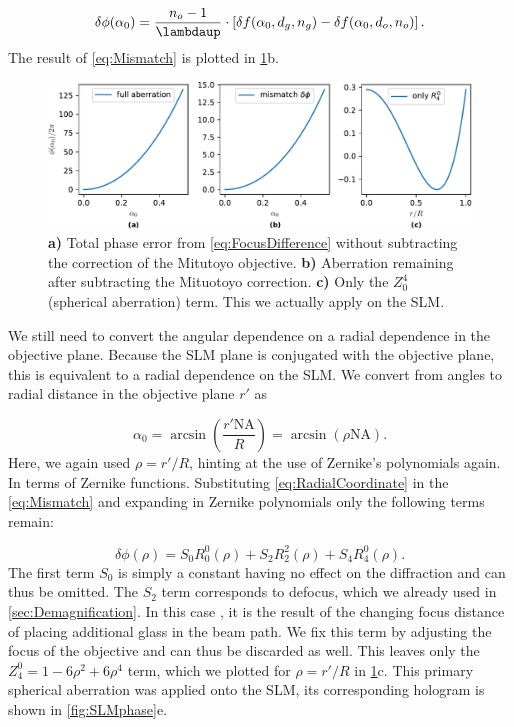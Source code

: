 \begin{equation}\label{eq:Mismatch}
    \delta \phi(\alpha_0)=
    \frac{n_o-1}{\lambdaup}\cdot
    \left[\delta f(\alpha_0,d_g,n_g)-\delta f(\alpha_0,d_o,n_o)\right].
\end{equation}
The result of \cref{eq:Mismatch} is plotted in \cref{fig:AberrationTerm}b.
\begin{figure}
    \centering
    \includegraphics[width=\textwidth]{figures/SphericalAberrationTerms.pdf}
    \caption{
    \textsf{\textbf{a)}} Total phase error from \cref{eq:FocusDifference} without subtracting the correction of the Mitutoyo objective.
    \textsf{\textbf{b)}} Aberration remaining after subtracting the Mituotoyo correction.
    \textsf{\textbf{c)}} Only the $Z_0^4$ (spherical aberration) term. This we actually apply on the SLM.
    }
    \label{fig:AberrationTerm}
\end{figure}
We still need to convert the angular dependence on a radial dependence in the objective plane. 
Because the SLM plane is conjugated with the objective plane, this is equivalent to a radial dependence on the SLM. We convert from angles to radial distance in the objective plane $r'$ as

\begin{equation}\label{eq:RadialCoordinate}
    \alpha_0 = \operatorname{arcsin}\left(\frac{r'\text{NA}}{R}\right)
    =\operatorname{arcsin}\left(\rho \text{NA}\right).
\end{equation}
Here, we again used $\rho=r'/R$, hinting at the use of Zernike's polynomials again.
In terms of Zernike functions.
Substituting \cref{eq:RadialCoordinate} in the \cref{eq:Mismatch} and expanding in Zernike polynomials only the following terms remain:

\begin{equation}
    \delta \phi(\rho) = S_0 R_0^0(\rho) + S_2 R_2^2(\rho) + S_4 R_4^0(\rho).
\end{equation}
The first term $S_0$ is simply a constant having no effect on the diffraction and can thus be omitted. 
The $S_2$ term corresponds to defocus, which we already used in \cref{sec:Demagnification}.
In this case , it is the result of the changing focus distance of placing additional glass in the beam path.
We fix this term by adjusting the focus of the objective and can thus be discarded as well.
This leaves only the $Z_4^0 = 1 - 6 \rho^2 + 6 \rho^4$ term, which we plotted for $\rho=r'/R$ in \cref{fig:AberrationTerm}c.
This primary spherical aberration was applied onto the SLM, its corresponding hologram is shown in \cref{fig:SLMphase}e.


